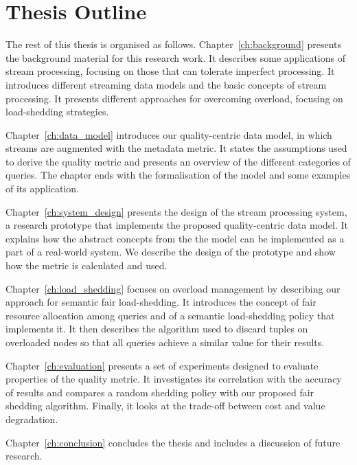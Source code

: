 \section{Thesis Outline}

The rest of this thesis is organised as follows. Chapter~\ref{ch:background} presents the background
material for this research work. It describes some applications of stream processing, focusing on
those that can tolerate imperfect processing. It introduces different streaming data models and the
basic concepts of stream processing. It presents different approaches for overcoming overload, focusing
on \mbox{load-shedding} strategies.

Chapter~\ref{ch:data_model} introduces our quality-centric data model, in which streams are augmented
with the \sic metadata metric. It states the assumptions used to derive the quality metric and presents
an overview of the different categories of queries. The chapter ends with the formalisation of the model
and some examples of its application.

Chapter~\ref{ch:system_design} presents the design of the \sys stream processing system, a research
prototype that implements the proposed quality-centric data model. It explains how the abstract concepts
from the the model can be implemented as a part of a real-world system. We describe the design of the
prototype and show how the \sic metric is calculated and used.

Chapter~\ref{ch:load_shedding} focuses on overload management by describing our approach for semantic
fair \mbox{load-shedding}. It introduces the concept of fair resource allocation among
queries and of a semantic load-shedding policy that implements it. It then describes the algorithm used
to discard tuples on overloaded nodes so that all queries achieve a similar \sic value for their results.

Chapter~\ref{ch:evaluation} presents a set of experiments designed to evaluate properties of the
\sic quality metric. It investigates its correlation with the accuracy of results and compares a random
shedding policy with our proposed fair shedding algorithm. Finally, it looks at the trade-off between
cost and \sic value degradation.

Chapter~\ref{ch:conclusion} concludes the thesis and includes a discussion of future research.
